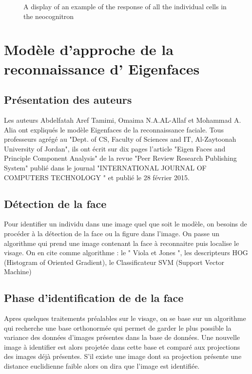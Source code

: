 \documentclass[12pt, letterpaper]{article}
\begin{document}
\begin{figure}[H]
    \caption{A display of an  example of the response of all the individual cells in the neocognitron}
    \label{fig:L6}
\end{figure}

\section{Modèle d'approche de la reconnaissance d’ Eigenfaces}
\subsection{Présentation des auteurs}
\par Les auteurs Abdelfatah Aref Tamimi, Omaima N.A.AL-Allaf et Mohammad A. Alia ont expliqués le modèle Eigenfaces de la reconnaissance faciale. Tous professeurs agrégé au "Dept. of CS, Faculty of Sciences and IT, Al-Zaytoonah University of Jordan", ils ont écrit sur dix pages l'article "Eigen Faces and Principle Component Analysis" de la revue "Peer Review Research Publishing System" publié dans le journal "INTERNATIONAL JOURNAL OF COMPUTERS TECHNOLOGY " et publié le 28 février 2015.

\subsection{Détection de la face}
\par Pour identifier un individu dans une image quel que soit le modèle, on besoins de procéder à la détection de la face ou la figure dans l'image. On passe un algorithme qui prend une image contenant la face à reconnaitre puis localise le visage. On en cite comme algorithme : le " Viola et Jones ", les descripteurs HOG (Histogram of Oriented Gradient), le Classificateur SVM (Support Vector Machine)

\subsection{Phase d'identification de de la face}
Apres quelques traitements préalables sur le visage, on se base sur un algorithme qui recherche une base orthonormée qui permet de garder le plus possible la variance des données d’images présentes dans la base de données. Une nouvelle image à identifier est alors projetée dans cette base et comparé aux projections des images déjà présentes. S’il existe une image dont sa projection présente une distance euclidienne faible alors on dira que l’image est identifiée.\\
\end{document}
